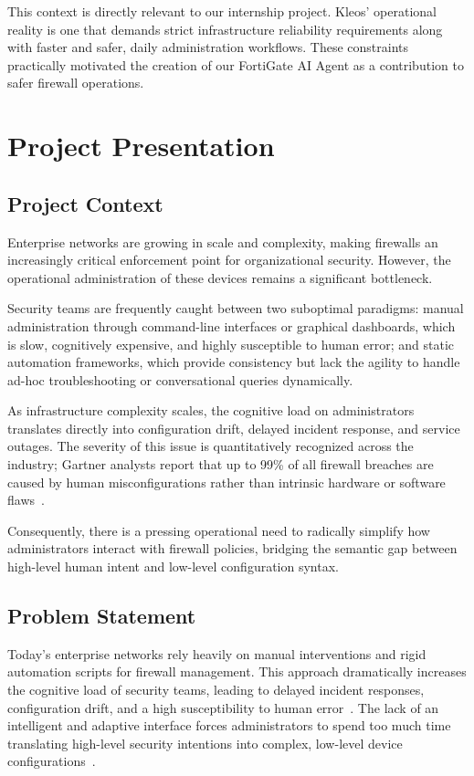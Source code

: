 This context is directly relevant to our internship project.  Kleos’ operational reality is one that demands strict infrastructure reliability requirements along with faster and safer, daily administration workflows. These constraints practically motivated the creation of our FortiGate AI Agent as a contribution to safer firewall operations.

\section{Project Presentation}

\subsection{Project Context}
Enterprise networks are growing in scale and complexity, making firewalls an increasingly critical enforcement point for organizational security. However, the operational administration of these devices remains a significant bottleneck. 

Security teams are frequently caught between two suboptimal paradigms: manual administration through command-line interfaces or graphical dashboards, which is slow, cognitively expensive, and highly susceptible to human error; and static automation frameworks, which provide consistency but lack the agility to handle ad-hoc troubleshooting or conversational queries dynamically.

As infrastructure complexity scales, the cognitive load on administrators translates directly into configuration drift, delayed incident response, and service outages. The severity of this issue is quantitatively recognized across the industry; Gartner analysts report that up to 99\% of all firewall breaches are caused by human misconfigurations rather than intrinsic hardware or software flaws~\cite{gartner_firewall}. 

Consequently, there is a pressing operational need to radically simplify how administrators interact with firewall policies, bridging the semantic gap between high-level human intent and low-level configuration syntax.

\subsection{Problem Statement}
Today’s enterprise networks rely heavily on manual interventions and rigid automation scripts for firewall management. This approach dramatically increases the cognitive load of security teams, leading to delayed incident responses, configuration drift, and a high susceptibility to human error~\cite{oppenheimer2003why}. The lack of an intelligent and adaptive interface forces administrators to spend too much time translating high-level security intentions into complex, low-level device configurations~\cite{benson2009network}.

